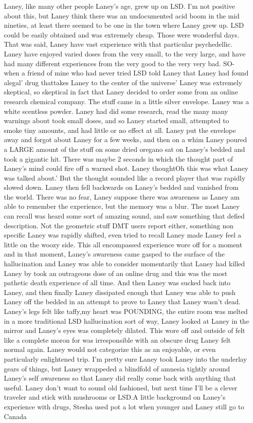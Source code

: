 \documentclass[12pt]{book}
\begin{document}
Laney, like many other people Laney's age, grew up on LSD. I'm not positive about this, but Laney think there was an undocumented acid boom in the mid nineties, at least there seemed to be one in the town where Laney grew up. LSD could be easily obtained and was extremely cheap. Those were wonderful days. That was said, Laney have vast experience with that particular psychedellic. Laney have enjoyed varied doses from the very small, to the very large, and have had many different experiences from the very good to the very very bad. SO- when a friend of mine who had never tried LSD told Laney that Laney had found alegal' drug thattakes Laney to the center of the universe' Laney was extremely skeptical, so skeptical in fact that Laney decided to order some from an online research chemical company. The stuff came in a little silver envelope. Laney was a white scentless powder. Laney had did some research, read the many many warnings about took small doses, and so Laney started small, attempted to smoke tiny amounts, and had little or no effect at all. Laney put the envelope away and forgot about Laney for a few weeks, and then on a whim Laney poured a LARGE amount of the stuff on some dried oregano sat on Laney's bedded and took a gigantic hit. There was maybe 2 seconds in which the thought part of Laney's mind could fire off a warned shot. Laney thoughtOh this was what Laney was talked about.' But the thought sounded like a record player that was rapidly slowed down. Laney then fell backwards on Laney's bedded and vanished from the world. There was no fear, Laney suppose there was awareness as Laney am able to remember the experience, but the memory was a blur. The most Laney can recall was heard some sort of amazing sound, and saw something that defied description. Not the geometric stuff DMT users report either, something non specific Laney was rapidly shifted, even tried to recall Laney made Laney feel a little on the woozy side. This all encompassed experience wore off for a moment and in that moment, Laney's awareness came gasped to the surface of the hallucination and Laney was able to consider momentarily that Laney had killed Laney by took an outrageous dose of an online drug and this was the most pathetic death experience of all time. And then Laney was sucked back into Laney, and then finally Laney dissipated enough that Laney was able to push Laney off the bedded in an attempt to prove to Laney that Laney wasn't dead. Laney's legs felt like taffy,my heart was POUNDING, the entire room was melted in a more traditional LSD hallucination sort of way, Laney looked at Laney in the mirror and Laney's eyes was completely dilated. This wore off and outside of felt like a complete moron for was irresponsible with an obscure drug Laney felt normal again. Laney would not categorize this as an enjoyable, or even particularly enlightened trip. I'm pretty sure Laney took Laney into the underlay gears of things, but Laney wrappeded a blindfold of amnesia tightly around Laney's self awareness so that Laney did really come back with anything that useful. Laney don't want to sound old fashioned, but next time I'll be a clever traveler and stick with mushrooms or LSD.A little background on Laney's experience with drugs, Stesha used pot a lot when younger and Laney still go to Canada 
\end{document}
